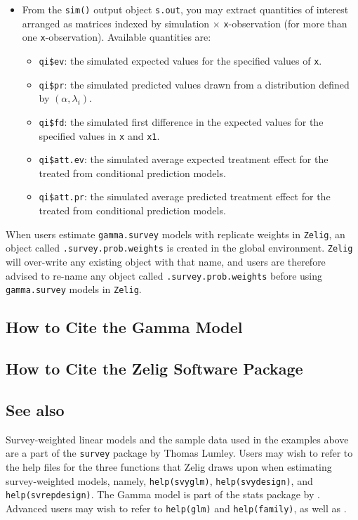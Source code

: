 \begin{itemize}
\item From the {\tt sim()} output object {\tt s.out}, you may extract
  quantities of interest arranged as matrices indexed by simulation
  $\times$ {\tt x}-observation (for more than one {\tt x}-observation).
  Available quantities are:

   \begin{itemize}
   \item {\tt qi\$ev}: the simulated expected values for the specified
     values of {\tt x}.
   \item {\tt qi\$pr}: the simulated predicted values drawn from a
     distribution defined by $(\alpha, \lambda_i)$.
   \item {\tt qi\$fd}: the simulated first difference in the expected
     values for the specified values in {\tt x} and {\tt x1}.
   \item {\tt qi\$att.ev}: the simulated average expected treatment
     effect for the treated from conditional prediction models.  
   \item {\tt qi\$att.pr}: the simulated average predicted treatment
     effect for the treated from conditional prediction models.  
   \end{itemize}
\end{itemize}

When users estimate {\tt gamma.survey} models with replicate weights in {\tt Zelig}, an 
object called {\tt .survey.prob.weights} is created in the global environment.  
{\tt Zelig} will over-write any existing object with that name, and users 
are therefore advised to re-name any object called {\tt .survey.prob.weights} before using {\tt gamma.survey} models in {\tt Zelig}.

\subsection*{How to Cite the Gamma Model}

\subsection*{How to Cite the Zelig Software Package}
\CiteZelig

\subsection* {See also}
 
 Survey-weighted linear models and the sample data used in the
 examples above are a part of the {\tt survey} package by Thomas
 Lumley. Users may wish to refer to the help files for the three
 functions that Zelig draws upon when estimating survey-weighted
 models, namely, {\tt help(svyglm)}, {\tt help(svydesign)}, and {\tt
 help(svrepdesign)}.  The Gamma model is part of the stats package
 by \citet{VenRip02}. Advanced users may wish to refer to
 \texttt{help(glm)} and \texttt{help(family)}, as well as
 \cite{McCNel89}.
  



  